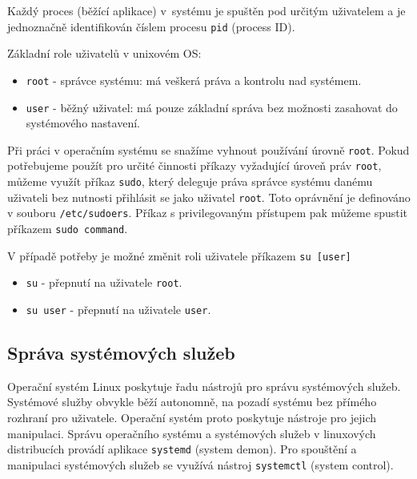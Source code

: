 Každý proces (běžící aplikace) v~systému je spuštěn pod určitým uživatelem a je jednoznačně identifikován číslem procesu {\tt pid} (process ID).

Základní role uživatelů v unixovém OS:
\begin{itemize}
  \item \texttt{root} - správce systému: má veškerá práva a kontrolu nad systémem.
  \item \texttt{user} - běžný uživatel: má pouze základní správa bez možnosti zasahovat do systémového nastavení.
\end{itemize}

Při práci v operačním systému se snažíme vyhnout používání úrovně  \texttt{root}. Pokud potřebujeme použít pro určité činnosti příkazy vyžadující úroveň práv {\tt root}, můžeme využít příkaz \texttt{sudo}, který deleguje práva správce systému danému uživateli bez nutnosti přihlásit se jako uživatel {\tt root}. Toto oprávnění je definováno v souboru {\tt /etc/sudoers}. Příkaz s privilegovaným přístupem pak můžeme spustit příkazem {\tt sudo command}. 

V případě potřeby je možné změnit roli uživatele příkazem \texttt{su [user]}
\begin{itemize}
  \item \texttt{su} - přepnutí na uživatele \texttt{root}.
  \item \texttt{su user} - přepnutí na uživatele \texttt{user}.
\end{itemize}

\subsection{Správa systémových služeb}
\label{sluzby}
Operační systém Linux poskytuje řadu nástrojů pro správu systémových služeb. 
Systémové služby obvykle běží autonomně, na pozadí systému bez přímého rozhraní pro uživatele. Operační systém proto poskytuje nástroje pro jejich manipulaci. Správu operačního systému a systémových služeb v linuxových distribucích provádí aplikace \texttt{systemd} (system demon). Pro spouštění a manipulaci systémových služeb se využívá nástroj {\tt systemctl} (system control).

